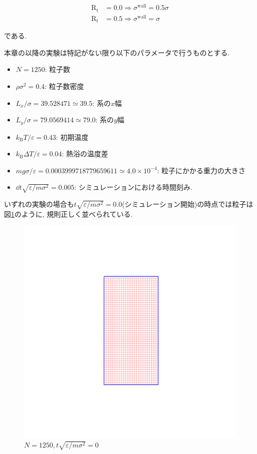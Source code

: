\begin{align}
  \text{R}_\text{t} &= 0.0 \Rightarrow \sigma^{\text{wall}} = 0.5 \sigma \\
  \text{R}_\text{t} &= 0.5 \Rightarrow \sigma^{\text{wall}} = \sigma 
\end{align}

である. 



本章の以降の実験は特記がない限り以下のパラメータで行うものとする. 

\begin{itemize}
  \item $N = 1250$: 粒子数
  \item $\rho {\sigma}^2 = 0.4$: 粒子数密度
  \item $L_x / \sigma = 39.528471 \simeq 39.5$: 系の$x$幅
  \item $L_y / \sigma = 79.0569414 \simeq 79.0$: 系の$y$幅
  \item $k_{\text{B}} T / \varepsilon = 0.43$: 初期温度
  \item $k_{\text{B}} \Delta T / \varepsilon = 0.04$: 熱浴の温度差
  \item $mg\sigma/\varepsilon = 0.0003999718779659611 \simeq 4.0 \times 10^{-4}$: 粒子にかかる重力の大きさ
  \item $\dd t \sqrt{\varepsilon/m{\sigma}^2} = 0.005$: シミュレーションにおける時間刻み.
\end{itemize}

いずれの実験の場合も$t\sqrt{\varepsilon/m{\sigma}^2}=0.0$(シミュレーション開始)の時点では粒子は図\ref{fig:linedUp}のように, 規則正しく並べられている.

\begin{figure}[H]
  \centering
  \includegraphics[scale=0.2]{image/initial1250.png}
  \caption{$N=1250, t\sqrt{\varepsilon/m{\sigma}^2}=0$}
  \label{fig:linedUp}
\end{figure}

